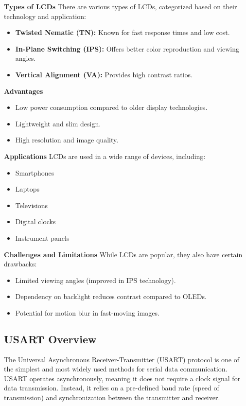 \documentclass{article}
\numberwithin{equation}{section}
\numberwithin{figure}{section}
\numberwithin{table}{section}
\begin{document}
\textbf{Types of LCDs}
There are various types of LCDs, categorized based on their technology and application:
\begin{itemize}
    \item \textbf{Twisted Nematic (TN):} Known for fast response times and low cost.
    \item \textbf{In-Plane Switching (IPS):} Offers better color reproduction and viewing angles.
    \item \textbf{Vertical Alignment (VA):} Provides high contrast ratios.
\end{itemize}

\textbf{Advantages}
\begin{itemize}
    \item Low power consumption compared to older display technologies.
    \item Lightweight and slim design.
    \item High resolution and image quality.
\end{itemize}

\textbf{Applications}
LCDs are used in a wide range of devices, including:
\begin{itemize}
    \item Smartphones
    \item Laptops
    \item Televisions
    \item Digital clocks
    \item Instrument panels
\end{itemize}

\textbf{Challenges and Limitations}
While LCDs are popular, they also have certain drawbacks:
\begin{itemize}
    \item Limited viewing angles (improved in IPS technology).
    \item Dependency on backlight reduces contrast compared to OLEDs.
    \item Potential for motion blur in fast-moving images.
\end{itemize}




\subsection{USART Overview}
The Universal Asynchronous Receiver-Transmitter (USART) protocol is one of the simplest and most widely used methods for serial data communication. USART operates asynchronously, meaning it does not require a clock signal for data transmission. Instead, it relies on a pre-defined baud rate (speed of transmission) and synchronization between the transmitter and receiver.
\end{document}
